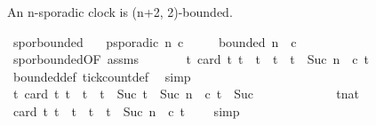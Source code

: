\begin{isabellebody}
{\isafoldproof}%
%
\isadelimproof
%
\endisadelimproof
%
\begin{isamarkuptext}%
An n-sporadic clock is (n+2, 2)-bounded.%
\end{isamarkuptext}\isamarkuptrue%
\isamarkupfalse%
\ spor{\isacharunderscore}bounded{}{\isacharcolon}\isanewline
\ \ \ {\isacartoucheopen}p{\isacharunderscore}sporadic\ n\ c{\isacartoucheclose}\isanewline
\ \ \ \ \ {\isacartoucheopen}bounded\ {\isacharparenleft}n{\isacharplus}{}{\isacharparenright}\ {}\ c{\isacartoucheclose}\isanewline
%
\isadelimproof
%
\endisadelimproof
%
\isatagproof
{}\isamarkupfalse%
\ {\isacharminus}\isanewline
\ \ \isamarkupfalse%
\ spor{\isacharunderscore}bounded{\isacharbrackleft}OF\ assms{\isacharbrackright}\ \isamarkupfalse%
\isanewline
\ \ \ \ \ \ {\isacharasterisk}{\isacharcolon}{\isacartoucheopen}{\isasymforall}t{\isachardot}\ card\ {\isacharbraceleft}t{\isacharprime}{\isachardot}\ t\ {\isasymle}\ t{\isacharprime}\ {\isasymand}\ t{\isacharprime}\ {\isacharless}\ t\ {\isacharplus}\ Suc\ n\ {\isasymand}\ c\ t{\isacharprime}{\isacharbraceright}\ {\isasymle}\ {}{\isacartoucheclose}\isanewline
\ \ \ \ \isamarkupfalse%
\ bounded{\isacharunderscore}def\ tick{\isacharunderscore}count{\isacharunderscore}def\ \isamarkupfalse%
\ simp\isanewline
\ \ \isamarkupfalse%
\ {\isacartoucheopen}{\isasymforall}t{\isachardot}\ card\ {\isacharbraceleft}t{\isacharprime}{\isachardot}\ t\ {\isasymle}\ t{\isacharprime}\ {\isasymand}\ t{\isacharprime}\ {\isacharless}\ Suc\ {\isacharparenleft}t\ {\isacharplus}\ Suc\ n{\isacharparenright}\ {\isasymand}\ c\ t{\isacharprime}{\isacharbraceright}\ {\isasymle}\ Suc\ {}{\isacartoucheclose}\isanewline
\ \ \isamarkupfalse%
\ {\isacharminus}\isanewline
\ \ \ \ \isacommand{{\isacharbraceleft}}\isamarkupfalse%
\ \isamarkupfalse%
\ t{\isacharcolon}{\isacharcolon}nat\isanewline
\ \ \ \ \ \ \isamarkupfalse%
\ {\isacharasterisk}\ \isamarkupfalse%
\ {\isacharasterisk}{\isacharasterisk}{\isacharcolon}{\isacartoucheopen}card\ {\isacharbraceleft}t{\isacharprime}{\isachardot}\ t\ {\isasymle}\ t{\isacharprime}\ {\isasymand}\ t{\isacharprime}\ {\isacharless}\ t\ {\isacharplus}\ Suc\ n\ {\isasymand}\ c\ t{\isacharprime}{\isacharbraceright}\ {\isasymle}\ {}{\isacartoucheclose}\ \isamarkupfalse%
\ simp\isanewline
\ \ \ \ \ \ \isamarkupfalse%

\end{isabellebody}
